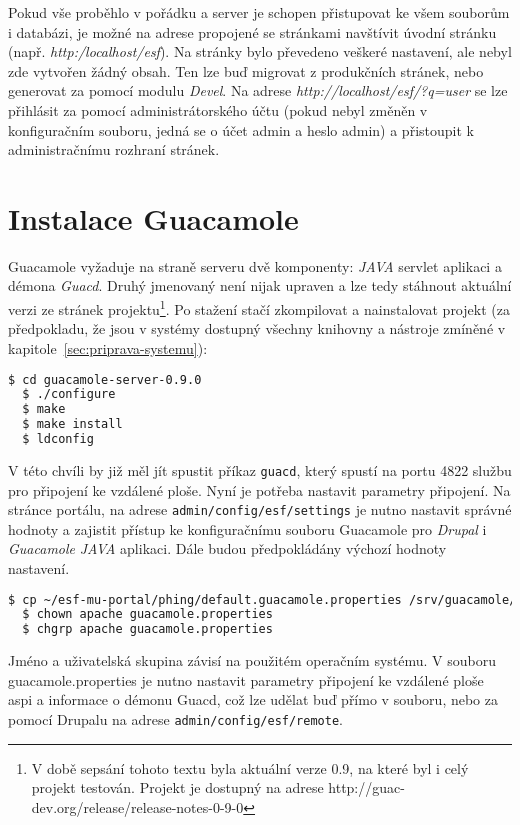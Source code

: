 Pokud vše proběhlo v pořádku a server je schopen přistupovat ke všem souborům i databázi, je možné na adrese propojené se stránkami navštívit úvodní stránku (např. \emph{http:/localhost/esf}). Na stránky bylo převedeno veškeré nastavení, ale nebyl zde vytvořen žádný obsah. Ten lze buď migrovat z produkčních stránek, nebo generovat za pomocí modulu \emph{Devel}. Na adrese \emph{http://localhost/esf/?q=user} se lze přihlásit za pomocí administrátorského účtu (pokud nebyl změněn v konfiguračním souboru, jedná se o účet admin a heslo admin) a přistoupit k administračnímu rozhraní stránek.

\section{Instalace Guacamole}
Guacamole vyžaduje na straně serveru dvě komponenty: \emph{JAVA} \gls{servlet} aplikaci a démona \emph{Guacd}. Druhý jmenovaný není nijak upraven a lze tedy stáhnout aktuální verzi ze stránek projektu\footnote{V době sepsání tohoto textu byla aktuální verze 0.9, na které byl i celý projekt testován. Projekt je dostupný na adrese http://guac-dev.org/release/release-notes-0-9-0}. Po stažení stačí zkompilovat a nainstalovat projekt (za předpokladu, že jsou v systémy dostupný všechny knihovny a nástroje zmíněné v kapitole~\ref{sec:priprava-systemu}):

\begin{lstlisting}[language=bash]
  $ cd guacamole-server-0.9.0
  $ ./configure
  $ make
  $ make install
  $ ldconfig
\end{lstlisting}

V této chvíli by již měl jít spustit příkaz \texttt{guacd}, který spustí na portu 4822 službu pro připojení ke vzdálené ploše. Nyní je potřeba nastavit parametry připojení. Na stránce portálu, na adrese \texttt{admin/config/esf/settings} je nutno nastavit správné hodnoty a zajistit přístup ke konfiguračnímu souboru Guacamole pro \emph{Drupal} i \emph{Guacamole} \emph{JAVA} aplikaci. Dále budou předpokládány výchozí hodnoty nastavení.

\begin{lstlisting}[language=bash]
  $ cp ~/esf-mu-portal/phing/default.guacamole.properties /srv/guacamole/guacamole.properties
  $ chown apache guacamole.properties 
  $ chgrp apache guacamole.properties 
\end{lstlisting}

Jméno a uživatelská skupina závisí na použitém operačním systému. V souboru guacamole.properties je nutno nastavit parametry připojení ke vzdálené ploše \gls{aspi} a informace o démonu Guacd, což lze udělat buď přímo v souboru, nebo za pomocí Drupalu na adrese \texttt{admin/config/esf/remote}. 

